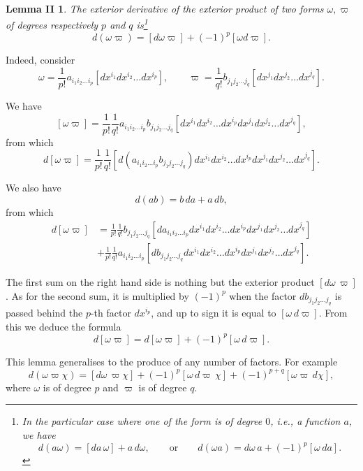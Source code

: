 \newtheorem*{lem2*}{\hspace{15pt}Lemma II}
\begin{lem2*}
  The exterior derivative of the exterior product of two forms $\omega,\varpi$ of degrees respectively $p$ and $q$ is\footnote{In the particular case where one of the form is of degree $0$, {i.e.}, a function $a$, we have
\[
d(a\omega)=[da\,\omega]+a\,d\omega,\qquad\text{or}\qquad d(\omega a)= d\omega\, a+(-1)^{p}[\omega\, da].
\]}
\begin{equation}
  \label{eq:2.3}
  d(\omega\varpi)=[d\omega\varpi]+(-1)^{p}[\omega d\varpi].
\end{equation}
\end{lem2*}

Indeed, consider
\[
\omega=\frac{1}{p!}a_{i_{1}i_{2}\dots i_{p}}[dx^{i_{1}}dx^{i_{2}}\dots dx^{i_{p}}],\qquad
\varpi=\frac{1}{q!}b_{j_{1}j_{2}\dots j_{q}}[dx^{j_{1}}dx^{j_{2}}\dots dx^{j_{q}}].
\]

We have
\[
[\omega\varpi]=\frac{1}{p!}\frac{1}{q!}a_{i_{1}i_{2}\dots i_{p}}b_{j_{1}j_{2}\dots j_{q}}[dx^{i_{1}}dx^{i_{2}}\dots dx^{i_{p}}dx^{j_{1}}dx^{j_{2}}\dots dx^{j_{q}}],
\]
from which
\[
d[\omega\varpi]=\frac{1}{p!}\frac{1}{q!}[d(a_{i_{1}i_{2}\dots i_{p}}b_{j_{1}j_{2}\dots j_{q}})dx^{i_{1}}dx^{i_{2}}\dots dx^{i_{p}}dx^{j_{1}}dx^{j_{2}}\dots dx^{j_{q}}].
\]

We also have
\[
d(ab)=b\,da+a\,db,
\]
from which
\begin{align*}
d[\omega\varpi]&=\frac{1}{p!}\frac{1}{q!}b_{j_{1}j_{2}\dots j_{q}}[da_{i_{1}i_{2}\dots i_{p}}dx^{i_{1}}dx^{i_{2}}\dots dx^{i_{p}}dx^{j_{1}}dx^{j_{2}}\dots dx^{j_{q}}]\\
&+\frac{1}{p!}\frac{1}{q!}a_{i_{1}i_{2}\dots i_{p}}[db_{j_{1}j_{2}\dots j_{q}}dx^{i_{1}}dx^{i_{2}}\dots dx^{i_{p}}dx^{j_{1}}dx^{j_{2}}\dots dx^{j_{q}}].
\end{align*}

The first sum on the right hand side is nothing but the exterior product $[d\omega\,\varpi]$. As for the second sum, it is multiplied by $(-1)^{p}$ when the factor $db_{j_{1}j_{2}\dots j_{q}}$ is passed  behind the $p$-th factor $dx^{i_{p}}$, and up to  sign it is equal to $[\omega\,d\varpi]$. From this we deduce the formula
\[
d[\omega\varpi]=d[\omega\varpi]+(-1)^{p}[\omega\, d\varpi].
\]

This lemma generalises to the produce of any number of factors. For example
\begin{equation}
  \label{eq:2.4}
  d(\omega\varpi\chi)=[d\omega\,\varpi\chi]+(-1)^{p}[\omega \,d\varpi\,\chi]+(-1)^{p+q}[\omega\varpi\, d\chi],
\end{equation}
where $\omega$ is of degree $p$ and $\varpi$ is of degree $q$.

